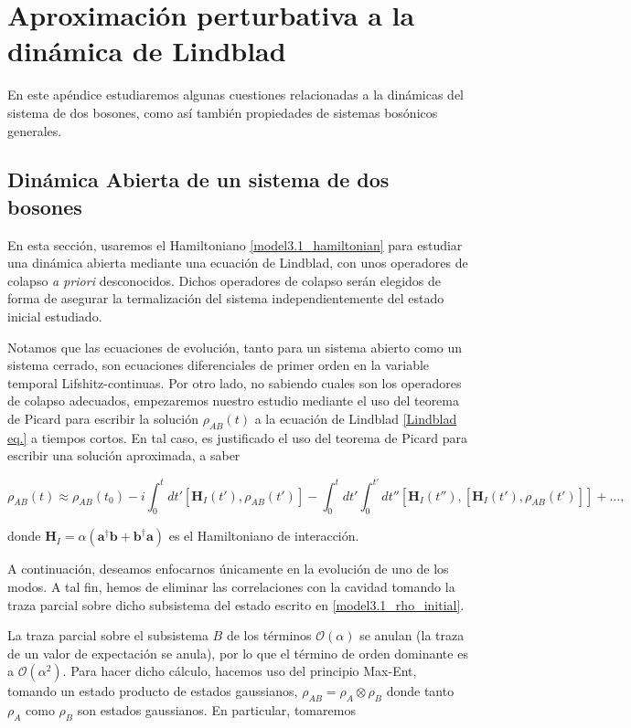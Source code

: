 \documentclass{report} %
\numberwithin{equation}{section}
\begin{document}
\chapter{Aproximaci\'on perturbativa a la din\'amica de Lindblad}
\label{ApendixA}
En este apéndice estudiaremos algunas cuestiones relacionadas a la dinámicas del sistema de dos bosones, como así también propiedades de sistemas bosónicos generales. 

\section{Din\'amica Abierta de un sistema de dos bosones}

En esta sección, usaremos el Hamiltoniano \eqref{model3.1_hamiltonian} para estudiar una dinámica abierta mediante una ecuación de Lindblad, con unos operadores de colapso \textit{a priori} desconocidos. Dichos operadores de colapso serán elegidos de forma de asegurar la termalización del sistema independientemente del estado inicial estudiado. 

Notamos que las ecuaciones de evolución, tanto para un sistema abierto como un sistema cerrado, son ecuaciones diferenciales de primer orden en la variable temporal Lifshitz-continuas. Por otro lado, no sabiendo cuales son los operadores de colapso adecuados, empezaremos nuestro estudio mediante el uso del teorema de Picard \cite{CohenTannoudji1989} para escribir la solución $\rho_{AB}(t)$ a la ecuación de Lindblad \eqref{Lindblad eq.} a tiempos cortos. En tal caso, es justificado el uso del teorema de Picard para escribir una solución aproximada, a saber

\begin{equation}
    \rho_{AB}(t) \approx \rho_{AB}(t_0)-i\int_{0}^{t} dt' [\mathbf{H}_{I}(t'), \rho_{AB}(t')] - \int_{0}^{t} dt' \int_{0}^{t'} dt'' [\mathbf{H}_{I}(t''),[\mathbf{H}_{I}(t'), \rho_{AB}(t')]] + \ldots,
    \label{model3.1_rho_initial}
\end{equation}

donde $\mathbf{H}_I = \alpha({\mathbf a}^{\dagger}{\mathbf b}+ {\mathbf b}^{\dagger}{\mathbf a})$ es el Hamiltoniano de interacción. 

A continuación, deseamos enfocarnos únicamente en { la evolución de uno de los modos}. A tal fin, hemos de {\color{red} } eliminar las correlaciones con la cavidad tomando la traza parcial sobre dicho subsistema del estado escrito en \eqref{model3.1_rho_initial}.

La traza parcial sobre el subsistema $B$ de los términos $\mathcal{O}(\alpha)$ se anulan (la traza de un valor de expectación se anula), por lo que el término de orden dominante es a $\mathcal{O}(\alpha^2)$. Para hacer dicho cálculo, hacemos uso del principio Max-Ent, tomando un estado producto de estados gaussianos, $\rho_{AB} = \rho_{A} \otimes \rho_B$ donde tanto $\rho_A$ como $\rho_B$ son estados gaussianos. En particular, tomaremos
\end{document}
